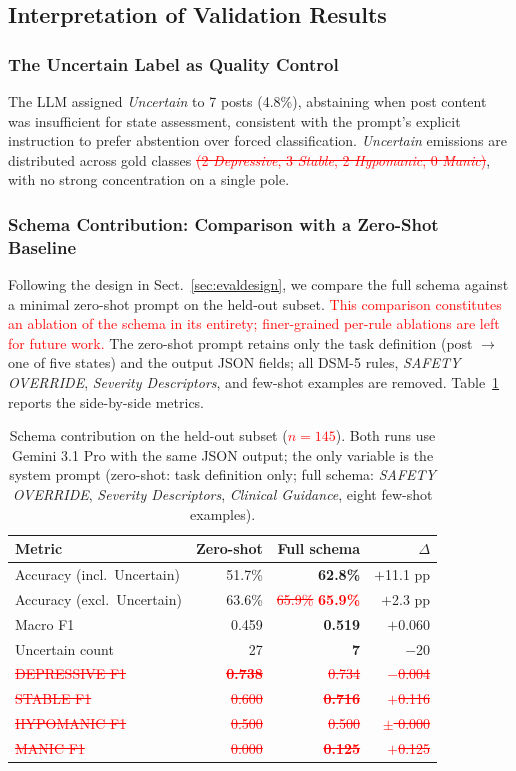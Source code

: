 \documentclass[runningheads]{llncs}
\newcommand{\rev}[1]{\textcolor{red}{#1}}
\newcommand{\del}[1]{\textcolor{red}{\sout{#1}}}
\newcommand{\zsperclassrows}{\del{DEPRESSIVE F1} & \del{\textbf{0.738}} & \del{0.734} & \del{$-$0.004} \\ \del{STABLE F1} & \del{0.600} & \del{\textbf{0.716}} & \del{$+$0.116} \\ \del{HYPOMANIC F1} & \del{0.500} & \del{0.500} & \del{$\pm$ 0.000} \\ \del{MANIC F1} & \del{0.000} & \del{\textbf{0.125}} & \del{$+$0.125} \\}
\newcommand{\rev}[1]{#1}
\newcommand{\del}[1]{}
\newcommand{\zsperclassrows}{}
\begin{document}
\subsection{Interpretation of Validation Results}

\subsubsection{The Uncertain Label as Quality Control}
The LLM assigned \emph{Uncertain} to 7 posts (4.8\%), abstaining when post content was insufficient for state assessment, consistent with the prompt's explicit instruction to prefer abstention over forced classification. \emph{Uncertain} emissions are distributed across gold classes\del{ (2 \emph{Depressive}, 3 \emph{Stable}, 2 \emph{Hypomanic}, 0 \emph{Manic})}, with no strong concentration on a single pole.

\subsubsection{Schema Contribution: Comparison with a Zero-Shot Baseline}
Following the design in Sect.~\ref{sec:evaldesign}, we compare the full schema against a minimal zero-shot prompt on the held-out subset. \rev{This comparison constitutes an ablation of the schema in its entirety; finer-grained per-rule ablations are left for future work.} The zero-shot prompt retains only the task definition (post $\rightarrow$ one of five states) and the output JSON fields; all DSM-5 rules, \emph{SAFETY OVERRIDE}, \emph{Severity Descriptors}, and few-shot examples are removed. Table~\ref{tab:zeroshot} reports the side-by-side metrics.

\begin{table}[t]
\caption{Schema contribution on the held-out subset (\rev{$n=145$}). Both runs use Gemini 3.1 Pro with the same JSON output; the only variable is the system prompt (zero-shot: task definition only; full schema: \emph{SAFETY OVERRIDE}, \emph{Severity Descriptors}, \emph{Clinical Guidance}, eight few-shot examples).}
\label{tab:zeroshot}
\centering
\setlength{\tabcolsep}{8pt}
\begin{tabular}{lrrr}
\toprule
\textbf{Metric} & \textbf{Zero-shot} & \textbf{Full schema} & \textbf{$\Delta$} \\
\midrule
Accuracy (incl.\ Uncertain) & 51.7\% & \textbf{62.8\%} & $+$11.1 pp \\
Accuracy (excl.\ Uncertain) & 63.6\% & \del{65.9\%} \rev{\textbf{65.9\%}} & $+$2.3 pp \\
Macro F1 & 0.459 & \textbf{0.519} & $+$0.060 \\
Uncertain count & 27 & \textbf{7} & $-$20 \\
\zsperclassrows
\bottomrule
\end{tabular}
\end{table}
\end{document}
